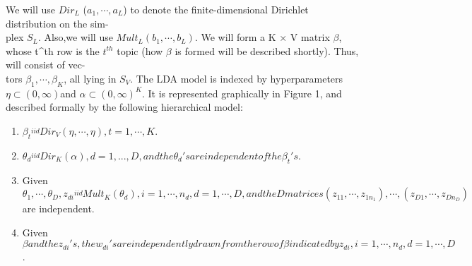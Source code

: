 \documentclass[12pt, letterpaper]{article}
\begin{document}
We will use $Dir_L$ ($a_1,\cdots,a_L$) to denote the finite-dimensional Dirichlet distribution on the sim-\\plex $S_L$. Also,we will use $Mult_L(b_1, \cdots, b_L)$. We will form a K $\times$ V matrix $\beta$, whose t^{th} row is the $t^{th}$ topic (how $\beta$ is formed will be described shortly). Thus, \beta will consist of vec-\\tors $\beta_1, \cdots, \beta_K$, all lying in $S_V$. The LDA model is indexed by hyperparameters $\eta \subset (0, \infty) $and $\alpha \subset (0, \infty)^K$. It is represented graphically in Figure 1, and described formally by the following hierarchical model:
\begin{enumerate}
\item $\beta_t \stackrel{iid}{~} Dir_V(\eta,\cdots,\eta), t = 1,\cdots, K$.
\item $\theta_d \stackrel{iid}{~} Dir_K(\alpha),d = 1,...,D, and the \theta_d's are independent of the \beta_t's$.
\item Given $ \theta_1,\cdots,\theta_D,z_{di} \stackrel{iid}{~} Mult_K(\theta_d), i = 1,\cdots,n_d, d=1,\cdots,D, and the D matrices (z_{11},\cdots,z_{1n_1}),\cdots,(z_{D1},\cdots,z_{Dn_D})$ are independent.
\item Given $\beta and the z_{di}'s, the w_{di}'s are independently drawn from the row of \beta indicated by z_{di}, i = 1,\cdots,n_d, d=1,\cdots,D$.
\end{enumerate}
\end{document}
